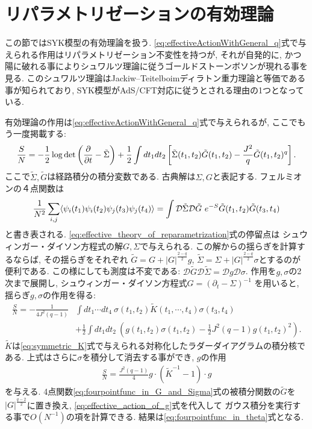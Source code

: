 \section{リパラメトリゼーションの有効理論 \label{sec:effective_theory}}
この節ではSYK模型の有効理論を扱う. 
\eqref{eq:effectiveActionWithGeneral_q}式で与えられる作用はリパラメトリゼーション不変性を持つが, 
それが自発的に, かつ陽に破れる事によりシュワルツ理論に従うゴールドストーンボソンが現れる事を見る. 
このシュワルツ理論はJackiw--Teitelboimディラトン重力理論と等価である事が知られており, 
SYK模型がAdS/CFT対応に従うとされる理由の1つとなっている. 

有効理論の作用は\eqref{eq:effectiveActionWithGeneral_q}式で与えられるが, 
ここでもう一度掲載する:
\begin{align}
	\frac{S}{N}
	= -\frac{1}{2}\log\det\left(\frac{\partial}{\partial t} - \tilde{\Sigma}\right)
		+ \frac{1}{2}\int dt_1dt_2
		\left[
			\tilde{\Sigma}(t_1, t_2)\tilde{G}(t_1, t_2)
			- \frac{J^2}{q}\tilde{G}(t_1, t_2)^q
		\right].
	\label{eq:effective_theory_of_reparametrization}
\end{align}
ここで$\tilde{\Sigma},\tilde{G}$は経路積分の積分変数である. 
古典解は$\Sigma, G$と表記する. 
フェルミオンの４点関数は
\begin{align}
	\frac{1}{N^2}\sum_{i,j}\average{\psi_i(t_1)\psi_i(t_2)\psi_j(t_3)\psi_j(t_4)}
	= \int \mathcal{D}\tilde{\Sigma}\mathcal{D}\tilde{G}\ 
		e^{-S}\tilde{G}(t_1, t_2)\tilde{G}(t_3, t_4)
	\label{eq:fourpointfunc_in_G_and_Sigma}
\end{align}
と書き表される. 
\eqref{eq:effective_theory_of_reparametrization}式の停留点は
シュウィンガー・ダイソン方程式の解$G,\Sigma$で与えられる. 
この解からの揺らぎを計算するならば, その揺らぎをそれぞれ
$\tilde{G} = G + |G|^{\frac{2-q}{2}}g$, 
$\tilde{\Sigma} = \Sigma + |G|^{\frac{2-q}{2}}\sigma$とするのが便利である. 
この様にしても測度は不変である: 
$\mathcal{D}\tilde{G}\mathcal{D}\tilde{\Sigma} = \mathcal{D}g\mathcal{D}\sigma$. 
作用を$g,\sigma$の2次まで展開し, シュウィンガー・ダイソン方程式$G = (\partial_t - \Sigma)^{-1}$
を用いると, 揺らぎ$g,\sigma$の作用を得る:
\begin{align}
	\frac{S}{N}
		= -\frac{1}{4J^2(q-1)}&\int dt_1\cdots dt_4\ 
			\sigma(t_1, t_2)\tilde{K}(t_1, \cdots, t_4)\sigma(t_3, t_4)\nonumber\\
		&+ \frac{1}{2}\int dt_1dt_2\ 
		\left(
			g(t_1, t_2)\sigma(t_1, t_2) - \frac{1}{2}J^2(q-1)g(t_1, t_2)^2
		\right).
\end{align}
$\tilde{K}$は\eqref{eq:symmetric_K}式で与えられる対称化したラダーダイアグラムの積分核である. 
上式はさらに$\sigma$を積分して消去する事ができ, $g$の作用
\begin{align}
	\frac{S}{N} = \frac{J^2(q-1)}{4}g\cdot(\tilde{K}^{-1} - 1)\cdot g
	\label{eq:effective_action_of_g}
\end{align}
を与える. 
4点関数\eqref{eq:fourpointfunc_in_G_and_Sigma}式の被積分関数の$\tilde{G}$を
$|G|^{\frac{q-2}{2}}$に置き換え, \eqref{eq:effective_action_of_g}式を代入して
ガウス積分を実行する事で$O(N^{-1})$の項を計算できる. 
結果は\eqref{eq:fourpointfunc_in_theta}式となる. 

